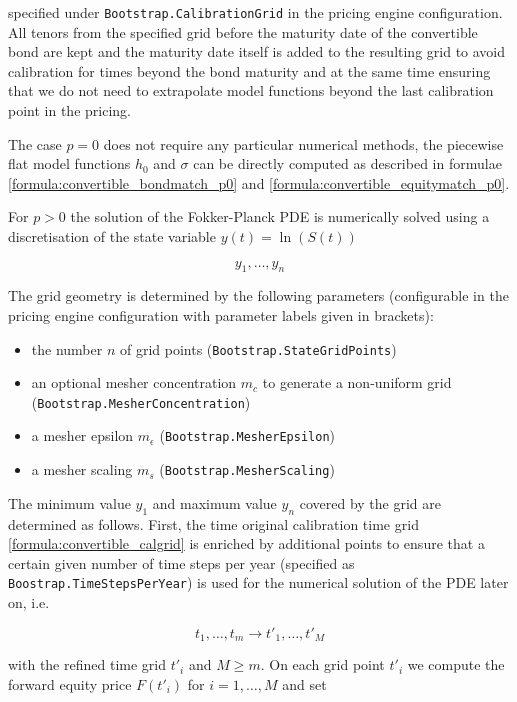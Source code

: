 {specified under \verb+Bootstrap.CalibrationGrid+ in the pricing engine configuration. All tenors from the specified grid
before the maturity date of the convertible bond are kept and the maturity date itself is added to the resulting grid to
avoid calibration for times beyond the bond maturity and at the same time ensuring that we do not need to extrapolate
model functions beyond the last calibration point in the pricing.

The case $p=0$ does not require any particular numerical methods, the piecewise flat model functions $h_0$ and $\sigma$
can be directly computed as described in formulae \ref{formula:convertible_bondmatch_p0} and
\ref{formula:convertible_equitymatch_p0}.

For $p>0$ the solution of the Fokker-Planck PDE is numerically solved using a discretisation of the state variable
$y(t)=\ln(S(t))$

\begin{equation}
  y_1, \ldots, y_n
\end{equation}

The grid geometry is determined by the following parameters (configurable in the pricing engine configuration with
parameter labels given in brackets):

\begin{itemize}
\item the number $n$ of grid points (\verb+Bootstrap.StateGridPoints+)
\item an optional mesher concentration $m_c$ to generate a non-uniform grid \\ (\verb+Bootstrap.MesherConcentration+)
\item a mesher epsilon $m_\epsilon$ (\verb+Bootstrap.MesherEpsilon+)
\item a mesher scaling $m_s$ (\verb+Bootstrap.MesherScaling+)
\end{itemize}

The minimum value $y_1$ and maximum value $y_n$ covered by the grid are determined as follows. First, the time original
calibration time grid \ref{formula:convertible_calgrid} is enriched by additional points to ensure that a certain given
number of time steps per year (specified as \verb+Boostrap.TimeStepsPerYear+) is used for the numerical solution of the
PDE later on, i.e.

\begin{equation}
  t_1, \ldots, t_m \rightarrow t'_1, \ldots, t'_M
\end{equation}

with the refined time grid $t'_i$ and $M\geq m$. On each grid point $t'_i$ we compute the forward equity price $F(t'_i)$
for $i=1,\ldots,M$ and set

}
